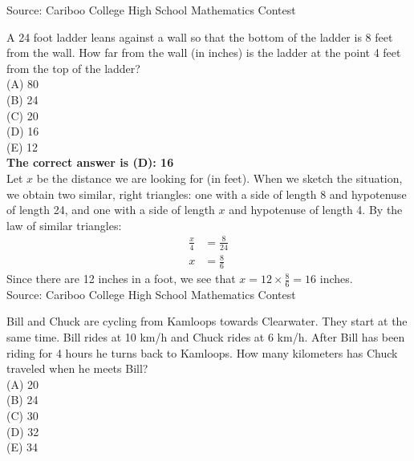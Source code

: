 \documentclass{article}
\begin{document}
\scriptsize
Source: Cariboo College High School Mathematics Contest

\normalsize
A 24 foot ladder leans against a wall so that the bottom of the ladder is 8 feet from the wall. How far from the wall (in inches) is the ladder at the point 4 feet from the top of the ladder?\\
(A) 80\\
(B) 24\\
(C) 20\\
(D) 16\\
(E) 12\\


\textbf{The correct answer is (D): 16}\\[1 ex]
Let $x$ be the distance we are looking for (in feet). When we sketch the situation, we obtain two similar, right triangles: one with a side of length 8 and hypotenuse of length 24, and one with a side of length $x$ and hypotenuse of length 4. By the law of similar triangles:
\begin{align*}
\frac{x}{4}&=\frac{8}{24}\\
x&=\frac{8}{6}
\end{align*}
Since there are 12 inches in a foot, we see that $x=12\times\frac{8}{6}=16$ inches.
\\[5 ex]

\scriptsize
Source: Cariboo College High School Mathematics Contest

\normalsize
Bill and Chuck are cycling from Kamloops towards Clearwater. They start at the same time.  Bill rides at 10 km/h and Chuck rides at 6 km/h. After Bill has been riding for 4 hours he turns back to Kamloops. How many kilometers has Chuck traveled when he meets Bill?\\
(A) 20\\
(B) 24\\
(C) 30\\
(D) 32\\
(E) 34\\
\end{document}
